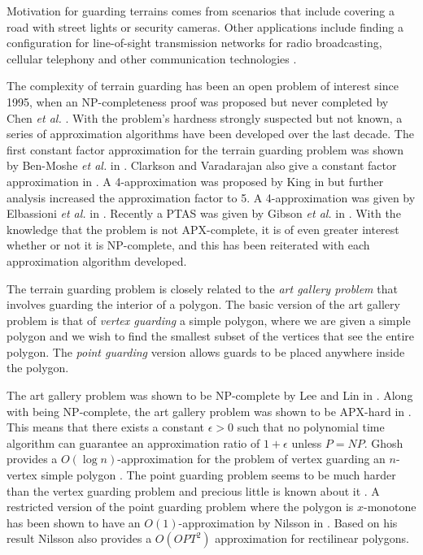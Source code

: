 \documentclass[11pt]{article}
\begin{document}
Motivation for guarding terrains comes from scenarios that include covering a road with street lights or security cameras.  Other applications include finding a configuration for line-of-sight transmission networks for radio broadcasting, cellular telephony and other communication technologies \cite{MKM05}.

The complexity of terrain guarding has been an open problem of interest since 1995, when an NP-completeness proof was proposed but never completed by Chen \textit{et al.} \cite{CEU96}.  With the problem's hardness strongly suspected but not known, a series of approximation algorithms have been developed over the last decade.
The first constant factor approximation for the terrain guarding problem was shown by Ben-Moshe \textit{et al.} in \cite{MKM05}.  Clarkson and Varadarajan also give a constant factor approximation in \cite{CV05}.  A 4-approximation was proposed by King in \cite{K06} but further analysis increased the approximation factor to 5.  A 4-approximation was given by Elbassioni \textit{et al.} in \cite{E09}.  Recently a PTAS was given by Gibson {\em et al.} in \cite{G09}.  With the knowledge that the problem is not APX-complete, it is of even greater interest whether or not it is NP-complete, and this has been reiterated with each approximation algorithm developed.

The terrain guarding problem is closely related to the \emph{art gallery problem} that involves guarding the interior of a polygon.  The basic version of
the art gallery problem is that of {\em vertex guarding} a simple polygon, where we are given a
simple polygon and we wish to find the smallest subset of the vertices that see the entire polygon.
The {\em point guarding} version allows guards to be placed anywhere inside the polygon.

The art gallery problem was shown to be NP-complete by Lee and Lin in \cite{LL86}.  Along with being NP-complete, the art gallery problem was shown to be APX-hard in \cite{E98}. This means that there exists a constant $\epsilon > 0$ such that no polynomial time algorithm can guarantee an approximation ratio of $1+\epsilon$ unless $P=NP$.   Ghosh provides a $O(\log n)$-approximation for the problem of vertex guarding an $n$-vertex simple polygon \cite{G88}.  The point guarding problem seems to be much harder than the vertex guarding problem and precious little is known about it \cite{DKDS07}.  A restricted version of the point guarding problem where the polygon is $x$-monotone has been shown to have an $O(1)$-approximation by Nilsson in \cite{N05}.  Based on his result Nilsson also provides a $O(OPT^2)$ approximation for rectilinear polygons.
\end{document}
